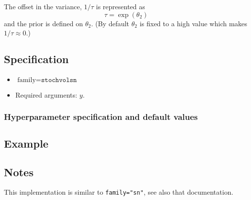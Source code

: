 \documentclass[a4paper,11pt]{article}
\begin{document}
The offset in the variance, $1/\tau$ is represented as
\begin{displaymath}
    \tau = \exp(\theta_2)
\end{displaymath}
and the prior is defined on $\theta_2$. (By default $\theta_2$ is
fixed to a high value which makes $1/\tau \approx 0$.)

\subsection*{Specification}

\begin{itemize}
\item $\text{family}=\texttt{stochvolsn}$
\item Required arguments: $y$.
\end{itemize}

\subsubsection*{Hyperparameter specification and default values}



\subsection*{Example}



\subsection*{Notes}

This implementation is similar to \texttt{family="sn"}, see also that
documentation.
\end{document}
